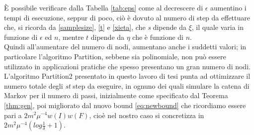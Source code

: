È possibile verificare dalla Tabella \ref{tab:eps} come al decrescere di $\epsilon$ aumentino i tempi di esecuzione, seppur di poco, ciò è dovuto al numero di step da effettuare che, si ricorda da \ref{samplesize}, \ref{t} e \ref{xieta}, che \textit{s} dipende da $\xi$, il quale varia in funzione di $\epsilon$ ed $n$, mentre $t$ dipende da $\eta$ che è funzione di $n$.\\
Quindi all'aumentare del numero di nodi, aumentano anche i suddetti valori; in particolare l'algoritmo Partition, sebbene sia polinomiale, non può essere utilizzato in applicazioni pratiche che spesso presentano un gran numero di nodi.
L'algoritmo Partition2 presentato in questo lavoro di tesi punta ad ottimizzare il numero totale degli \textit{st} step da eseguire, in ognuno dei quali simulare la catena di Markov per il numero di passi, inizialmente come specificato dal Teorema \ref{thm:gen}, poi migliorato dal nuovo bound \ref{eq:newbound} che ricordiamo essere pari a $2m^2\mu^{-4}w(I)w(F)$, cioè nel nostro caso si concretizza in $2m^2\mu^{-4}(log \frac{1}{\delta} + 1)$.
\clearpage
